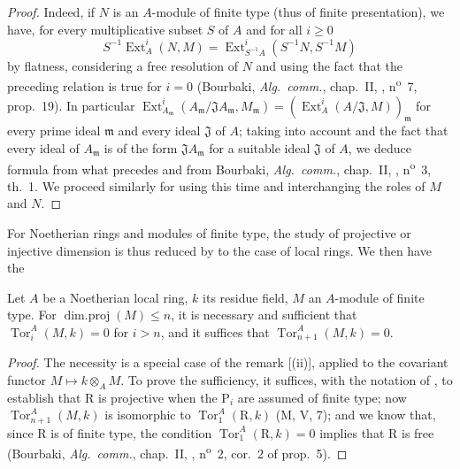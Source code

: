 \begin{proof}
Indeed, if $N$ is an $A$-module of finite type (thus of finite presentation), we have, for every multiplicative subset $S$ of $A$ and for all $i\geq 0$
\[
  S^{-1}\operatorname{Ext}^i_A(N,M)=\operatorname{Ext}^i_{S^{-1}\!A}(S^{-1}N,S^{-1}M)
\]
by flatness, considering a free resolution of $N$ and using the fact that the preceding relation is true for $i=0$ (Bourbaki, \emph{Alg.~comm.}, chap.~II, , n\textsuperscript{o}~7, prop.~19).
In particular $\operatorname{Ext}^i_{A_\mathfrak{m}}(A_\mathfrak{m}/\mathfrak{J}A_\mathfrak{m},M_\mathfrak{m})=(\operatorname{Ext}^i_A(A/\mathfrak{J},M))_\mathfrak{m}$ for every prime ideal $\mathfrak{m}$ and every ideal $\mathfrak{J}$ of $A$;
taking into account  and the fact that every ideal of $A_\mathfrak{m}$ is of the form $\mathfrak{J}A_\mathfrak{m}$ for a suitable ideal $\mathfrak{J}$ of $A$, we deduce formula  from what precedes and from Bourbaki, \emph{Alg.~comm.}, chap.~II, , n\textsuperscript{o}~3, th.~1.
We proceed similarly for  using this time  and interchanging the roles of $M$ and $N$.
\end{proof}

For Noetherian rings and modules of finite type, the study of projective or injective dimension is thus reduced by  to the case of local rings.
We then have the

\begin{lemma}[17.2.6]
\label{0.17.2.6}
Let $A$ be a Noetherian local ring, $k$ its residue field, $M$ an $A$-module of finite type.
For $\operatorname{dim.proj}(M)\leq n$, it is necessary and sufficient that $\operatorname{Tor}^A_i(M,k)=0$ for $i>n$, and it suffices that $\operatorname{Tor}^A_{n+1}(M,k)=0$.
\end{lemma}

\begin{proof}
The necessity is a special case of the remark [(ii)], applied to the covariant functor $M\mapsto k\otimes_A M$.
To prove the sufficiency, it suffices, with the notation of , to establish that $\mathrm{R}$ is projective when the $\mathrm{P}_i$ are assumed of finite type;
now $\operatorname{Tor}^A_{n+1}(M,k)$ is isomorphic to $\operatorname{Tor}^A_1(\mathrm{R},k)$ (M, V, 7);
and we know that, since $\mathrm{R}$ is of finite type, the condition $\operatorname{Tor}^A_1(\mathrm{R},k)=0$ implies that $\mathrm{R}$ is free (Bourbaki, \emph{Alg.~comm.}, chap.~II, , n\textsuperscript{o}~2, cor.~2 of prop.~5).
\end{proof}

